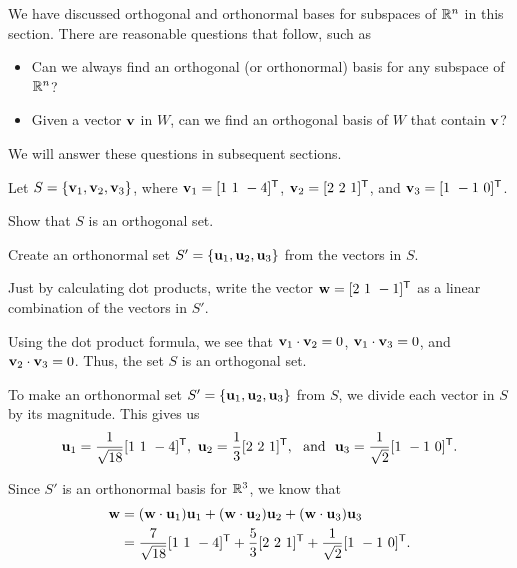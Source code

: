 We have discussed orthogonal and orthonormal bases for subspaces of $\mathbb{R}^n$ in this section. There are reasonable questions that follow, such as
\begin{itemize}
\item Can we always find an orthogonal (or orthonormal) basis for any subspace of $\mathbb{R}^n$?
\item Given a vector $\mathbf{v}$ in $W$, can we find an orthogonal basis of $W$ that contain $\mathbf{v}$?

\end{itemize}
We will answer these questions in subsequent sections.

\label{sec:orthog_set_exam}

\ExampleIntro

\begin{example} Let $S = \{\mathbf{v}_1, \mathbf{v}_2, \mathbf{v}_3\}$, where $\mathbf{v}_1 = [1 \ 1 \ -4]^{\mathsf{T}}$, $\mathbf{v}_2 = [2 \ 2 \ 1]^{\mathsf{T}}$, and $\mathbf{v}_3 = [1 \ -1 \ 0]^{\mathsf{T}}$.
\ba
\item Show that $S$ is an orthogonal set.

\item Create an orthonormal set $S' = \{\mathbf{u}_1, \mathbf{u}_2, \mathbf{u}_3\}$ from the vectors in $S$. 

\item Just by calculating dot products, write the vector $\mathbf{w} = [2 \ 1 \ -1]^{\mathsf{T}}$ as a linear combination of the vectors in $S'$.  

\ea

\ExampleSolution

\ba
\item Using the dot product formula, we see that $\mathbf{v}_1 \cdot \mathbf{v}_2 = 0$, $\mathbf{v}_1 \cdot \mathbf{v}_3 = 0$, and $\mathbf{v}_2 \cdot \mathbf{v}_3 = 0$. Thus, the set $S$ is an orthogonal set. 

\item To make an orthonormal set $S' = \{\mathbf{u}_1, \mathbf{u}_2, \mathbf{u}_3\}$ from $S$, we divide each vector in $S$ by its magnitude. This gives us
\[\vu_1 = \frac{1}{\sqrt{18}}[1 \ 1 \ -4]^{\tr}, \ \vu_2 = \frac{1}{3}[2 \ 2 \ 1]^{\tr}, \ \text{ and } \ \vu_3 = \frac{1}{\sqrt{2}} [1 \ -1 \ 0]^{\tr}.\]

\item Since $S'$ is an orthonormal basis for $\mathbb{R}^3$, we know that
\begin{align*}
\vw &= (\vw \cdot \vu_1) \vu_1 + (\vw \cdot \vu_2) \vu_2 + (\vw \cdot \vu_3) \vu_3  \\
	&= \frac{7}{\sqrt{18}}[1 \ 1 \ -4]^{\tr} +  \frac{5}{3}[2 \ 2 \ 1]^{\tr} + \frac{1}{\sqrt{2}}[1 \ -1 \ 0]^{\tr}.
\end{align*}

\ea

\end{example}

